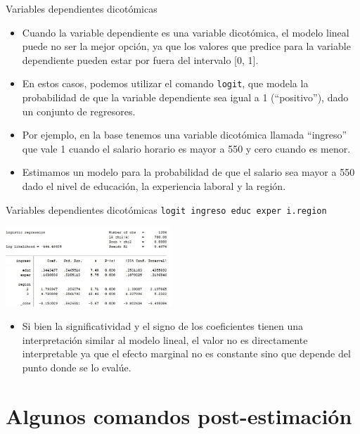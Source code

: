 \documentclass{beamer}
\begin{document}
\begin{frame}{Variables dependientes dicotómicas}
\begin{itemize}
\item Cuando la variable dependiente es una variable dicotómica, el modelo lineal puede no ser la mejor opción, ya que los valores que predice para la variable dependiente pueden estar por fuera del intervalo [0, 1]. 
\item En estos casos, podemos utilizar el comando \texttt{logit}, que modela la probabilidad de que la variable dependiente sea igual a 1 (``positivo''), dado un conjunto de regresores. 
\item Por ejemplo, en la base tenemos una variable dicotómica llamada ``ingreso'' que vale 1 cuando el salario horario es mayor a 550 y cero cuando es menor.
\item Estimamos un modelo para la probabilidad de que el salario sea mayor a 550 dado el nivel de educación, la experiencia laboral y la región.
\end{itemize}
\end{frame}

\begin{frame}{Variables dependientes dicotómicas}{}
{\footnotesize \texttt{logit ingreso educ exper i.region}}\\\smallskip
\centerline{\includegraphics[height=3cm]{reg3.jpg}}
\begin{itemize}
\item Si bien la significatividad y el signo de los coeficientes tienen una interpretación similar al modelo lineal, el valor no es directamente interpretable ya que el efecto marginal no es constante sino que depende del punto donde se lo evalúe.
\end{itemize}
\end{frame}

\section{Algunos comandos post-estimación}
\end{document}
